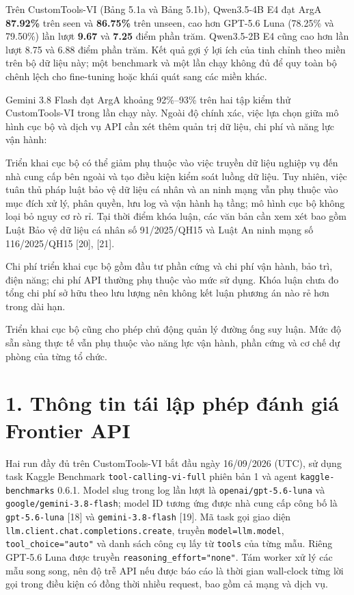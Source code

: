 Trên CustomTools-VI (Bảng 5.1a và Bảng 5.1b), Qwen3.5-4B E4 đạt ArgA \textbf{87.92\%} trên seen và \textbf{86.75\%} trên unseen, cao hơn GPT-5.6 Luna (78.25\% và 79.50\%) lần lượt \textbf{9.67} và \textbf{7.25} điểm phần trăm. Qwen3.5-2B E4 cũng cao hơn lần lượt 8.75 và 6.88 điểm phần trăm. Kết quả gợi ý lợi ích của tinh chỉnh theo miền trên bộ dữ liệu này; một benchmark và một lần chạy không đủ để quy toàn bộ chênh lệch cho fine-tuning hoặc khái quát sang các miền khác.

Gemini 3.8 Flash đạt ArgA khoảng 92\%–93\% trên hai tập kiểm thử CustomTools-VI trong lần chạy này. Ngoài độ chính xác, việc lựa chọn giữa mô hình cục bộ và dịch vụ API cần xét thêm quản trị dữ liệu, chi phí và năng lực vận hành:

Triển khai cục bộ có thể giảm phụ thuộc vào việc truyền dữ liệu nghiệp vụ đến nhà cung cấp bên ngoài và tạo điều kiện kiểm soát luồng dữ liệu. Tuy nhiên, việc tuân thủ pháp luật bảo vệ dữ liệu cá nhân và an ninh mạng vẫn phụ thuộc vào mục đích xử lý, phân quyền, lưu log và vận hành hạ tầng; mô hình cục bộ không loại bỏ nguy cơ rò rỉ. Tại thời điểm khóa luận, các văn bản cần xem xét bao gồm Luật Bảo vệ dữ liệu cá nhân số 91/2025/QH15 và Luật An ninh mạng số 116/2025/QH15 [20], [21].

Chi phí triển khai cục bộ gồm đầu tư phần cứng và chi phí vận hành, bảo trì, điện năng; chi phí API thường phụ thuộc vào mức sử dụng. Khóa luận chưa đo tổng chi phí sở hữu theo lưu lượng nên không kết luận phương án nào rẻ hơn trong dài hạn.

Triển khai cục bộ cũng cho phép chủ động quản lý đường ống suy luận. Mức độ sẵn sàng thực tế vẫn phụ thuộc vào năng lực vận hành, phần cứng và cơ chế dự phòng của từng tổ chức.

\section{1. Thông tin tái lập phép đánh giá Frontier API}

Hai run đầy đủ trên CustomTools-VI bắt đầu ngày 16/09/2026 (UTC), sử dụng task Kaggle Benchmark \texttt{tool-calling-vi-full} phiên bản 1 và agent \texttt{kaggle-benchmarks} 0.6.1. Model slug trong log lần lượt là \texttt{openai/gpt-5.6-luna} và \texttt{google/gemini-3.8-flash}; model ID tương ứng được nhà cung cấp công bố là \texttt{gpt-5.6-luna} [18] và \texttt{gemini-3.8-flash} [19]. Mã task gọi giao diện \texttt{llm.client.chat.completions.create}, truyền \texttt{model=llm.model}, \texttt{tool_choice="auto"} và danh sách công cụ lấy từ \texttt{tools} của từng mẫu. Riêng GPT-5.6 Luna được truyền \texttt{reasoning_effort="none"}. Tám worker xử lý các mẫu song song, nên độ trễ API nếu được báo cáo là thời gian wall-clock từng lời gọi trong điều kiện có đồng thời nhiều request, bao gồm cả mạng và dịch vụ.

